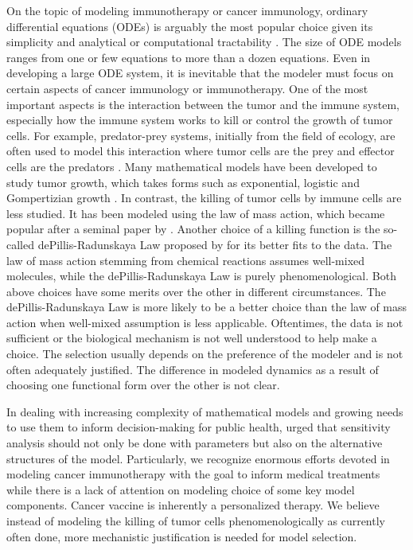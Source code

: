 \documentclass[review,authoryear]{elsarticle}
\begin{document}
On the topic of modeling immunotherapy or cancer immunology, ordinary
differential equations (ODEs) is arguably the most popular choice
given its simplicity and analytical or computational tractability
\citep{Eftimie2010}. The size of ODE models ranges from one or few
equations to more than a dozen equations. Even in developing a large
ODE system, it is inevitable that the modeler must focus on certain
aspects of cancer immunology or immunotherapy. One of the most important
aspects is the interaction between the tumor and the immune system, especially
how the immune system works to kill or control the growth of tumor cells. For example, predator-prey
systems, initially from the field of ecology, are often used to model this interaction where tumor cells
are the prey and effector cells are the predators \citep{Hamilton2022}. Many mathematical
models have been developed to study tumor growth, which takes forms such as exponential, logistic and Gompertizian
growth \citep{Murphy2016}. In contrast, the killing of tumor cells
by immune cells are less studied. It has been modeled using
the law of mass action, which became popular after a seminal paper by \citet{KUZNETSOV1994}.
Another choice of a killing function is the so-called dePillis-Radunskaya
Law proposed by \citet{dePillis2014} for its better fits to the data. The law of mass action stemming from chemical reactions assumes well-mixed molecules, while the dePillis-Radunskaya
Law is purely phenomenological. Both above choices have some merits over the other in different
circumstances. The dePillis-Radunskaya Law is more likely to be a
better choice than the law of mass action when well-mixed
assumption is less applicable. Oftentimes, the data is not sufficient or the biological mechanism is not well understood to help make a choice. The selection usually depends on the preference
of the modeler and is not often adequately justified. The difference in modeled dynamics
as a result of choosing one functional form over the other is not
clear. 

In dealing with increasing complexity of mathematical models and growing
needs to use them to inform decision-making for public health, \citet{Basu2013} urged that sensitivity analysis should
not only be done with parameters but also on the alternative structures
of the model. Particularly, we recognize enormous efforts devoted
in modeling cancer immunotherapy with the goal to inform medical treatments
while there is a lack of attention on modeling choice of some key
model components. Cancer vaccine is inherently a personalized
therapy. We believe instead of modeling the killing of tumor cells phenomenologically as currently often done, more mechanistic justification
is needed for model selection.
\end{document}
